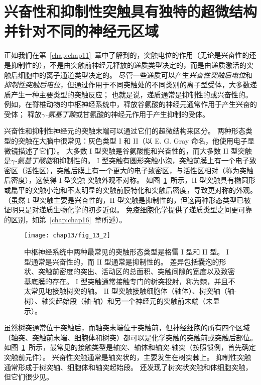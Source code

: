 \section{兴奋性和抑制性突触具有独特的超微结构并针对不同的神经元区域}

正如我们在第~\ref{chap:chap11}~章中了解到的，突触电位的作用（无论是兴奋性的还是抑制性的），不是由突触前神经元释放的递质类型决定的，而是由递质激活的突触后细胞中的离子通道类型决定的。
尽管一些递质可以产生\textit{兴奋性突触后电位}和\textit{抑制性突触后电位}，但通过作用于不同突触处的不同类别的离子型受体，大多数递质产生一种主要类型的突触反应；
也就是说，递质通常是抑制性的或兴奋性的。
例如，在脊椎动物的中枢神经系统中，释放谷氨酸的神经元通常作用于产生兴奋的受体；
释放\textit{$\gamma$-氨基丁酸}或甘氨酸的神经元作用于产生抑制的受体。


兴奋性和抑制性神经元的突触末端可以通过它们的超微结构来区分。
两种形态类型的突触在大脑中很常见：灰色类型 I 和 II（以 E. G. Gray 命名，他使用电子显微镜描述了它们）。
大多数 I 型突触是谷氨酸能和兴奋性的，而大多数 II 型突触是\textit{$\gamma$-氨基丁酸能}和抑制性的。
I 型突触有圆形突触小泡，突触前膜上有一个电子致密区（活性区），突触后膜上有一个更大的电子致密区，与活性区相对（称为突触后密度），这使得 I 型突触 突触外观不对称。 
如图~\ref{fig:13_2}~所示，II 型突触具有椭圆形或扁平的突触小泡和不太明显的突触前膜特化和突触后密度，导致更对称的外观。 
（虽然 I 型突触主要是兴奋性的，II 型突触是抑制性的，但这两种形态类型已被证明只是对递质生物化学的初步近似。
免疫细胞化学提供了递质类型之间更可靠的区别，如第~\ref{chap:chap16}~章所述）。


\begin{figure}[htbp]
	\centering
	\texttt{[image: chap13/fig\_13\_2]}
	\caption{中枢神经系统中两种最常见的突触形态类型是格雷 I 型和 II 型。
		I 型通常是兴奋性的，而 II 型通常是抑制性的。
		差异包括囊泡的形状、突触前密度的突出、活动区的总面积、突触间隙的宽度以及致密基底膜的存在。
		I 型突触通常接触专门的树突投射，称为棘，并且不太常见地接触树突的轴。
		II 型突触接触细胞体（轴体）、树突轴（轴-树）、轴突起始段（轴-轴）和另一个神经元的突触前末端（未显示）。}
	\label{fig:13_2}
\end{figure}


虽然树突通常位于突触后，而轴突末端位于突触前，但神经细胞的所有四个区域（轴突、突触前末端、细胞体和树突）都可以是化学突触的突触前或突触后部位。
如图~\ref{fig:13_2}~所示，最常见的接触类型是轴突、轴体和轴突-轴突（按照惯例，首先确定突触前元件）。
兴奋性突触通常是轴突状的，主要发生在树突棘上。
抑制性突触通常形成于树突轴、细胞体和轴突起始段。
还发现了树突状突触和体细胞突触，但它们很少见。


